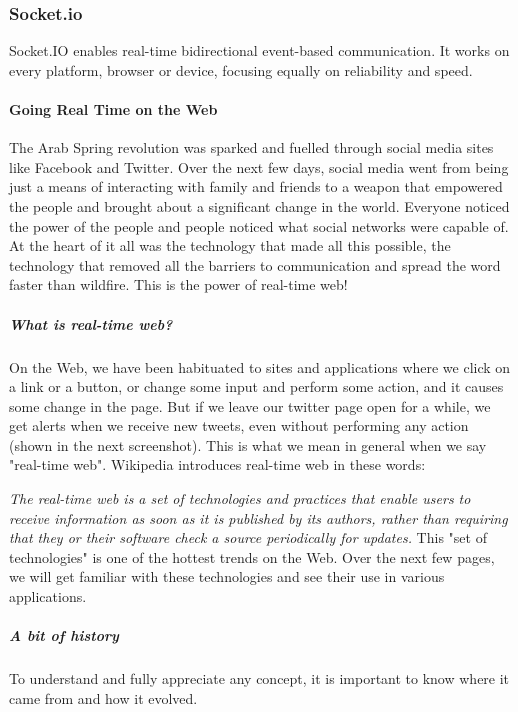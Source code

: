 \subsubsection{Socket.io}
Socket.IO enables real-time bidirectional event-based communication.
It works on every platform, browser or device, focusing equally on reliability and speed.
\paragraph*{Going Real Time on the Web}
\hfill \break
The Arab Spring revolution was sparked and fuelled through social media sites like
Facebook and Twitter. Over the next few days, social media went from being just
a means of interacting with family and friends to a weapon that empowered the
people and brought about a significant change in the world. Everyone noticed the
power of the people and people noticed what social networks were capable of. At
the heart of it all was the technology that made all this possible, the technology that
removed all the barriers to communication and spread the word faster than wildfire.
This is the power of real-time web!

\subparagraph*{What is real-time web?}
\hfill \break
On the Web, we have been habituated to sites and applications where we click on a
link or a button, or change some input and perform some action, and it causes some
change in the page. But if we leave our twitter page open for a while, we get alerts
when we receive new tweets, even without performing any action (shown in the next
screenshot). This is what we mean in general when we say "real-time web".
Wikipedia introduces real-time web in these words:

\textit{The real-time web is a set of technologies and practices that enable users to receive
information as soon as it is published by its authors, rather than requiring that they
or their software check a source periodically for updates.
}
This "set of technologies" is one of the hottest trends on the Web. Over the
next few pages, we will get familiar with these technologies and see their use
in various applications.

\subparagraph*{A bit of history}
\hfill \break
To understand and fully appreciate any concept, it is important to know where it
came from and how it evolved.

